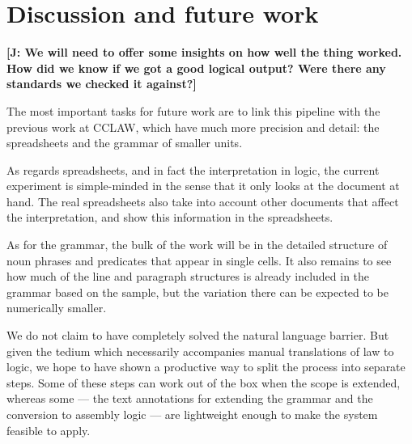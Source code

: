 \documentclass{IOS-Book-Article}
\newcommand{\todoj}[1]{{\color{red}\textbf{[J: #1]}}}
\begin{document}
\section{Discussion and future work}
\label{sec:future}

\todoj{ We will need to offer some insights on how well the thing worked. How did we know if we got a good logical output? Were there any standards we checked it against?}

The most important tasks for future work are to link this pipeline with the previous work at CCLAW, which have much more precision and detail: the spreadsheets and the grammar of smaller units.

As regards spreadsheets, and in fact the interpretation in logic, the current experiment is simple-minded in the sense that it only looks at the document at hand.
The real spreadsheets also take into account other documents that affect the interpretation, and show this information in the spreadsheets.

As for the grammar, the bulk of the work will be in the detailed structure of noun phrases and predicates that appear in single cells.
It also remains to see how much of the line and paragraph structures is already included in the grammar based on the sample, but the variation there can be expected to be numerically smaller.

We do not claim to have completely solved the natural language barrier.
But given the tedium which necessarily accompanies manual translations of law to logic, we hope to have shown a productive way to split the process into separate steps.
Some of these steps can work out of the box when the scope is extended, whereas some --- the text annotations for extending the grammar and the conversion to assembly logic --- are lightweight enough to make the system feasible to apply.




\end{document}
